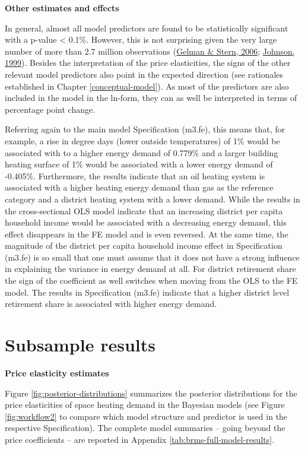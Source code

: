 \documentclass[12pt,twoside]{reedthesis}
\begin{document}
\textbf{Other estimates and effects}

In general, almost all model predictors are found to be statistically significant with a p-value \textless{} 0.1\%. However, this is not surprising given the very large number of more than 2.7 million observations (\protect\hyperlink{ref-gelman_stern06}{Gelman \& Stern, 2006}; \protect\hyperlink{ref-johnson99}{Johnson, 1999}). Besides the interpretation of the price elasticities, the signs of the other relevant model predictors also point in the expected direction (see rationales established in Chapter \ref{conceptual-model}). As most of the predictors are also included in the model in the ln-form, they can as well be interpreted in terms of percentage point change.

Referring again to the main model Specification (m3.fe), this means that, for example, a rise in degree days (lower outside temperatures) of 1\% would be associated with to a higher energy demand of 0.779\% and a larger building heating surface of 1\% would be associated with a lower energy demand of -0.405\%. Furthermore, the results indicate that an oil heating system is associated with a higher heating energy demand than gas as the reference category and a district heating system with a lower demand. While the results in the cross-sectional OLS model indicate that an increasing district per capita household income would be associated with a decreasing energy demand, this effect disappears in the FE model and is even reversed. At the same time, the magnitude of the district per capita household income effect in Specification (m3.fe) is so small that one must assume that it does not have a strong influence in explaining the variance in energy demand at all. For district retirement share the sign of the coefficient as well switches when moving from the OLS to the FE model. The results in Specification (m3.fe) indicate that a higher district level retirement share is associated with higher energy demand.

\hypertarget{subsample_results}{%
\section{Subsample results}\label{subsample_results}}

\textbf{Price elasticity estimates}

Figure \ref{fig:posterior-distributions} summarizes the posterior distributions for the price elasticities of space heating demand in the Bayesian models (see Figure \ref{fig:workflow2} to compare which model structure and predictor is used in the respective Specification). The complete model summaries -- going beyond the price coefficients -- are reported in Appendix \ref{tab:brms-full-model-results}.
\end{document}
